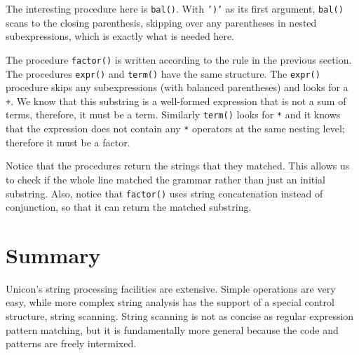 The interesting procedure here is \texttt{bal()}. With
\texttt{')'} as its first argument,
\texttt{bal()} scans to the closing parenthesis, skipping over any
parentheses in nested subexpressions, which is exactly what is needed
here.

The procedure \texttt{factor()} is written according to the rule in the
previous section. The procedures \texttt{expr()} and \texttt{term()}
have the same structure. The \texttt{expr()} procedure skips any
subexpressions (with balanced parentheses) and looks for a \texttt{+}.
We know that this substring is a well-formed expression that is not a
sum of terms, therefore, it must be a term. Similarly \texttt{term()}
looks for \texttt{*} and it knows that the expression does not contain
any \texttt{*} operators at the same nesting level; therefore it must
be a factor.

Notice that the procedures return the strings that they matched. This
allows us to check if the whole line matched the grammar rather than
just an initial substring. Also, notice that \texttt{factor()} uses
string concatenation instead of conjunction, so that it can return the
matched substring.

\section*{Summary}

Unicon's string processing facilities are extensive.
Simple operations are very easy, while more complex string analysis has
the support of a special control structure, string scanning. String
scanning is not as concise as regular expression pattern matching, but
it is fundamentally more general because the code and patterns are
freely intermixed.

